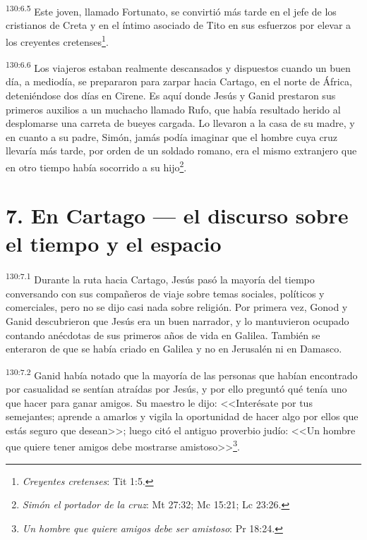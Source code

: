 \par 
\textsuperscript{130:6.5} Este joven, llamado Fortunato, se convirtió más tarde en el jefe de los cristianos de Creta y en el íntimo asociado de Tito en sus esfuerzos por elevar a los creyentes cretenses\footnote{\textit{Creyentes cretenses}: Tit 1:5.}.

\par 
\textsuperscript{130:6.6} Los viajeros estaban realmente descansados y dispuestos cuando un buen día, a mediodía, se prepararon para zarpar hacia Cartago, en el norte de África, deteniéndose dos días en Cirene. Es aquí donde Jesús y Ganid prestaron sus primeros auxilios a un muchacho llamado Rufo, que había resultado herido al desplomarse una carreta de bueyes cargada. Lo llevaron a la casa de su madre, y en cuanto a su padre, Simón, jamás podía imaginar que el hombre cuya cruz llevaría más tarde, por orden de un soldado romano, era el mismo extranjero que en otro tiempo había socorrido a su hijo\footnote{\textit{Simón el portador de la cruz}: Mt 27:32; Mc 15:21; Lc 23:26.}.

\section*{7. En Cartago --- el discurso sobre el tiempo y el espacio}
\par 
\textsuperscript{130:7.1} Durante la ruta hacia Cartago, Jesús pasó la mayoría del tiempo conversando con sus compañeros de viaje sobre temas sociales, políticos y comerciales, pero no se dijo casi nada sobre religión. Por primera vez, Gonod y Ganid descubrieron que Jesús era un buen narrador, y lo mantuvieron ocupado contando anécdotas de sus primeros años de vida en Galilea. También se enteraron de que se había criado en Galilea y no en Jerusalén ni en Damasco.

\par 
\textsuperscript{130:7.2} Ganid había notado que la mayoría de las personas que habían encontrado por casualidad se sentían atraídas por Jesús, y por ello preguntó qué tenía uno que hacer para ganar amigos. Su maestro le dijo: <<Interésate por tus semejantes; aprende a amarlos y vigila la oportunidad de hacer algo por ellos que estás seguro que desean>>; luego citó el antiguo proverbio judío: <<Un hombre que quiere tener amigos debe mostrarse amistoso>>\footnote{\textit{Un hombre que quiere amigos debe ser amistoso}: Pr 18:24.}.


